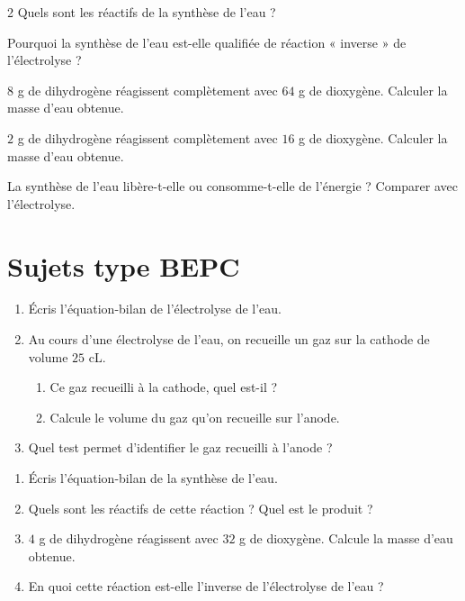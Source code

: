 \begin{multicols}{2}
\exo{} Quels sont les réactifs de la synthèse de l'eau ?

\exo{} Pourquoi la synthèse de l'eau est-elle qualifiée de réaction « inverse » de
l'électrolyse ?

\exo{} $8$ g de dihydrogène réagissent complètement avec $64$ g de dioxygène.
Calculer la masse d'eau obtenue.

\exo{} $2$ g de dihydrogène réagissent complètement avec $16$ g de dioxygène.
Calculer la masse d'eau obtenue.

\exo{} La synthèse de l'eau libère-t-elle ou consomme-t-elle de l'énergie ?
Comparer avec l'électrolyse.

\end{multicols}

\section{Sujets type BEPC}

\begin{enumerate}[label=\arabic*)]
\item Écris l'équation-bilan de l'électrolyse de l'eau.
\item Au cours d'une électrolyse de l'eau, on recueille un gaz sur la cathode de volume
$25$ cL.
\begin{enumerate}[label=\alph*)]
\item Ce gaz recueilli à la cathode, quel est-il ?
\item Calcule le volume du gaz qu'on recueille sur l'anode.
\end{enumerate}
\item Quel test permet d'identifier le gaz recueilli à l'anode ?
\end{enumerate}

\begin{enumerate}[label=\arabic*)]
\item Écris l'équation-bilan de la synthèse de l'eau.
\item Quels sont les réactifs de cette réaction ? Quel est le produit ?
\item $4$ g de dihydrogène réagissent avec $32$ g de dioxygène. Calcule la masse d'eau
obtenue.
\item En quoi cette réaction est-elle l'inverse de l'électrolyse de l'eau ?
\end{enumerate}

